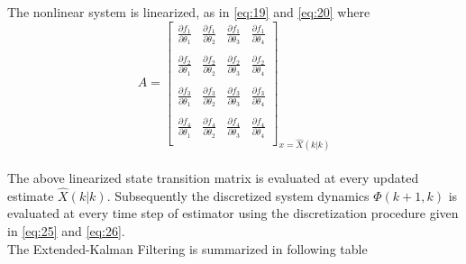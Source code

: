 \documentclass[a4paper]{article}
\begin{document}
The nonlinear system is linearized, as in \ref{eq:19} and \ref{eq:20}
where
\begin{equation}
A = \left[\begin{array}{cccc}
\frac{\partial f_1}{\partial \theta_1}& \frac{\partial f_1}{\partial \theta_2}  &  \frac{\partial f_1}{\partial \theta_3}  & \frac{\partial f_1}{\partial \theta_4}  \\ 
&&&\\
\frac{\partial f_2}{\partial \theta_1}& \frac{\partial f_2}{\partial \theta_2}  &  \frac{\partial f_2}{\partial \theta_3}  & \frac{\partial f_2}{\partial \theta_4}  \\  
&&&\\
\frac{\partial f_3}{\partial \theta_1}& \frac{\partial f_3}{\partial \theta_2}  &  \frac{\partial f_3}{\partial \theta_3}  & \frac{\partial f_3}{\partial \theta_4}  \\ 
&&&\\
\frac{\partial f_4}{\partial \theta_1}& \frac{\partial f_4}{\partial \theta_2}  &  \frac{\partial f_4}{\partial \theta_3}  & \frac{\partial f_4}{\partial \theta_4}  \\  
\end{array} \right]_{x = \hat X(k|k)}  
\label{eq:27}
\end{equation}\\
The above linearized state transition matrix is evaluated at every updated estimate $\hat X(k|k)$. Subsequently the discretized system dynamics $\Phi(k+1,k)$ is evaluated at every time step of estimator using the discretization procedure given in \ref{eq:25} and \ref{eq:26}.\\
\newpage
The Extended-Kalman Filtering is summarized in following table
\end{document}
